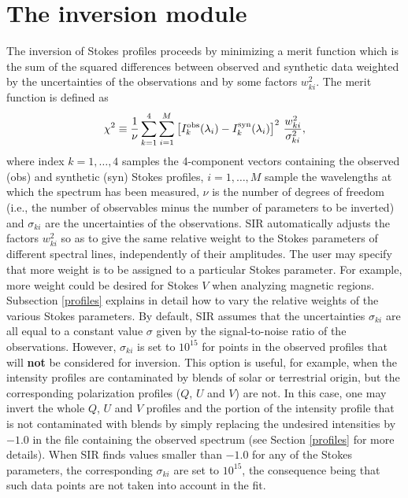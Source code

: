 \section{The inversion module}
\label{nodos}
The inversion of Stokes profiles proceeds by minimizing a merit function which 
is the sum of the squared differences between observed and synthetic data 
weighted by the uncertainties of the observations and by some factors 
$w_{ki}^2$. The merit function is defined as
\begin{equation}
\label{chi}
\chi^2 \equiv \frac{1}{\nu} \sum_{k=1}^4  \sum_{i=1}^M  
\left[ I_k^{\rm obs}(\lambda_i) - I_k^{\rm syn}(\lambda_i) \right]^2 \, 
\frac{w_{ki}^2}{\sigma_{ki}^2},
\end{equation}
where index $k=1,\ldots,4$ samples the 4-component vectors containing
the observed (obs) and synthetic (syn) Stokes profiles, $i =
1,\ldots,M$ sample the wavelengths at which the spectrum has been
measured, $\nu$ is the number of degrees of freedom (i.e., the number
of observables minus the number of parameters to be inverted) and
$\sigma_{ki}$ are the uncertainties of the observations. SIR
automatically adjusts the factors $w_{ki}^2$ so as to give the same
relative weight to the Stokes parameters of different spectral lines,
independently of their amplitudes. The user may specify that more weight is to be 
assigned to a particular Stokes parameter. For example, more weight
could be desired for Stokes $V$ when analyzing magnetic regions.
Subsection \ref{profiles} explains in detail how to vary the relative weights
of the various Stokes parameters. By default, SIR assumes that the
uncertainties $\sigma_{ki}$ are all equal to a constant value
$\sigma$ given by the signal-to-noise ratio of the observations.  
However, $\sigma_{ki}$ is set to $10^{15}$ for points in the 
observed profiles that will {\bf not} be considered for inversion. This
option is useful, for example, when the intensity profiles are
contaminated by blends of solar or terrestrial origin, but the
corresponding polarization profiles ($Q$, $U$ and $V$) are not. In this
case, one may invert the whole $Q$, $U$ and $V$ profiles and the portion
of the intensity profile that is not contaminated with blends by simply 
replacing the undesired intensities by $-1.0$ in the file containing the 
observed spectrum (see Section \ref{profiles} for more details). When SIR finds 
values smaller than $-1.0$ for any of the Stokes parameters, the 
corresponding $\sigma_{ki}$ are set to $10^{15}$, the consequence 
being that such data points are not taken into account in the fit.  

